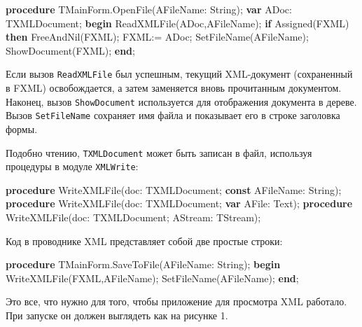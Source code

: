 \documentclass[
]{article}
\newenvironment{Shaded}{}{}
\newcommand{\DataTypeTok}[1]{\textcolor[rgb]{0.56,0.13,0.00}{#1}}
\newcommand{\KeywordTok}[1]{\textcolor[rgb]{0.00,0.44,0.13}{\textbf{#1}}}
\newcommand{\NormalTok}[1]{#1}
\begin{document}
\begin{Shaded}
\begin{Highlighting}[]
\KeywordTok{procedure}\NormalTok{ TMainForm.OpenFile(AFileName: }\DataTypeTok{String}\NormalTok{);}
\KeywordTok{var}
\NormalTok{  ADoc: TXMLDocument;}
\KeywordTok{begin}
\NormalTok{  ReadXMLFile(ADoc,AFileName);}
  \KeywordTok{if}\NormalTok{ Assigned(FXML) }\KeywordTok{then}\NormalTok{ FreeAndNil(FXML);}
\NormalTok{  FXML:= ADoc;}
\NormalTok{  SetFileName(AFileName);}
\NormalTok{  ShowDocument(FXML);}
\KeywordTok{end}\NormalTok{;}
\end{Highlighting}
\end{Shaded}

Если вызов \texttt{ReadXMLFile} был успешным, текущий XML-документ
(сохраненный в FXML) освобождается, а затем заменяется вновь прочитанным
документом. Наконец, вызов \texttt{ShowDocument} используется для
отображения документа в дереве. Вызов \texttt{SetFileName} сохраняет имя
файла и показывает его в строке заголовка формы.

Подобно чтению, \texttt{TXMLDocument} может быть записан в файл,
используя процедуры в модуле \texttt{XMLWrite}:

\begin{Shaded}
\begin{Highlighting}[]
\KeywordTok{procedure}\NormalTok{ WriteXMLFile(doc: TXMLDocument; }\KeywordTok{const}\NormalTok{ AFileName: }\DataTypeTok{String}\NormalTok{);}
\KeywordTok{procedure}\NormalTok{ WriteXMLFile(doc: TXMLDocument; }\KeywordTok{var}\NormalTok{ AFile: }\DataTypeTok{Text}\NormalTok{);}
\KeywordTok{procedure}\NormalTok{ WriteXMLFile(doc: TXMLDocument; AStream: TStream);}
\end{Highlighting}
\end{Shaded}

Код в проводнике XML представляет собой две простые строки:

\begin{Shaded}
\begin{Highlighting}[]
\KeywordTok{procedure}\NormalTok{ TMainForm.SaveToFile(AFileName: }\DataTypeTok{String}\NormalTok{);}
\KeywordTok{begin}
\NormalTok{  WriteXMLFile(FXML,AFileName);}
\NormalTok{  SetFileName(AFileName);}
\KeywordTok{end}\NormalTok{;}
\end{Highlighting}
\end{Shaded}

Это все, что нужно для того, чтобы приложение для просмотра XML
работало. При запуске он должен выглядеть как на рисунке 1.
\end{document}
